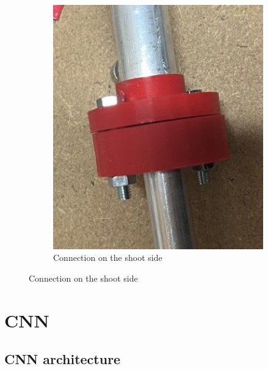 \begin{figure}
\begin{subfigure}{.5\textwidth}
        \includegraphics[width=0.9\linewidth]{../photos/connector_tube}
        \caption{Connection on the shoot side}
        \label{fig:connector_tube}
    \end{subfigure}
\end{figure}


\section{CNN}\label{sec:cnn}

\subsection{CNN architecture}\label{subsec:cnn-architecture}

